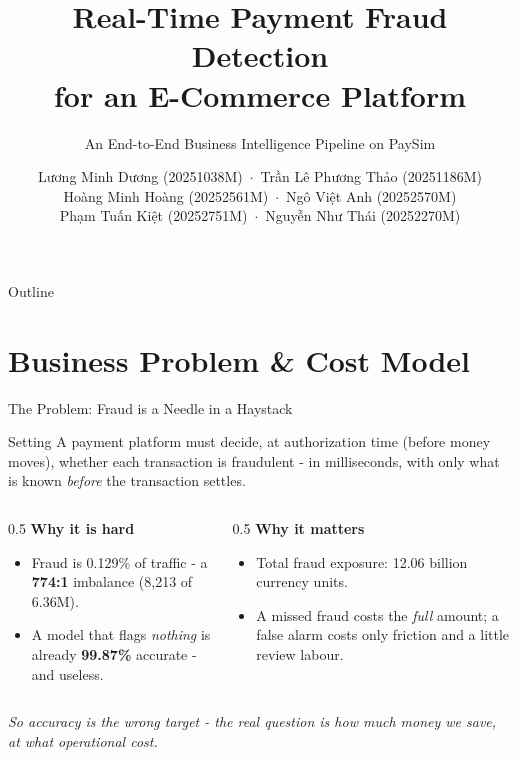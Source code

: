 \documentclass[t, aspectratio=169]{beamer} %
\title{Real-Time Payment Fraud Detection\\ for an E-Commerce Platform}
\subtitle{An End-to-End Business Intelligence Pipeline on PaySim}
\author{\texorpdfstring{%
\small Lương Minh Dương (20251038M)\, $\cdot$\, Trần Lê Phương Thảo (20251186M)\\[1pt]
\small Hoàng Minh Hoàng (20252561M)\, $\cdot$\, Ngô Việt Anh (20252570M)\\[1pt]
\small Phạm Tuấn Kiệt (20252751M)\, $\cdot$\, Nguyễn Như Thái (20252270M)%
}{Group 1}}
\institute{Group 1 $\cdot$ Business Intelligence (IT5315E) $\cdot$ HUST}
\begin{document}
\hustintropage{} %

\husttitlepage

\begin{frame}[t]{Outline}
	\vspace*{0.15cm}
	\tableofcontents
\end{frame}

\resetPageCount  %
\showPageNumber  %

\useStyleFull
\useThinBar

\section{Business Problem \& Cost Model}

\begin{frame}{The Problem: Fraud is a Needle in a Haystack}
	\begin{block}{Setting}
		A payment platform must decide, \alert{at authorization time} (before
		money moves), whether each transaction is fraudulent - in milliseconds,
		with only what is known \emph{before} the transaction settles.
	\end{block}
	\begin{columns}[T]
		\begin{column}{0.5\textwidth}
			\textbf{Why it is hard}
			\begin{itemize}
				\item Fraud is \alert{0.129\%} of traffic - a \textbf{774:1}
				      imbalance (8{,}213 of 6.36M).
				\item A model that flags \emph{nothing} is already
				      \textbf{99.87\%} accurate - and useless.
			\end{itemize}
		\end{column}
		\begin{column}{0.5\textwidth}
			\textbf{Why it matters}
			\begin{itemize}
				\item Total fraud exposure: \alert{12.06 billion} currency units.
				\item A missed fraud costs the \emph{full} amount; a false alarm
				      costs only friction and a little review labour.
			\end{itemize}
		\end{column}
	\end{columns}
	\vspace{0.3em}
	\centering\small\emph{So accuracy is the wrong target - the real question
	is how much money we save, at what operational cost.}
\end{frame}
\end{document}
